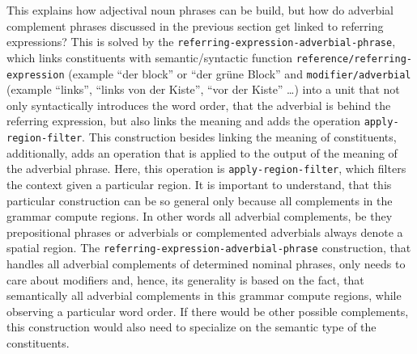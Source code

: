 This explains how adjectival noun phrases can be build, 
but how do adverbial complement phrases discussed in the 
previous section get linked to referring expressions? 
This is solved by the {\footnotesize\tt referring-expression-adverbial-phrase}, 
which links constituents with semantic/syntactic function 
{\footnotesize\tt reference/referring-expression} (example ``der block'' or ``der gr\"une Block'' 
and {\footnotesize\tt modifier/adverbial} (example ``links'', ``links von der Kiste'', 
``vor der Kiste'' \ldots) into a unit that not only syntactically introduces 
the word order, that the adverbial is behind the referring expression, 
but also links the meaning and adds the operation {\footnotesize\tt apply-region-filter}. 
This construction besides linking the meaning of constituents, additionally, 
adds an operation that is applied to the output of the meaning 
of the adverbial phrase. Here, this operation is {\footnotesize\tt apply-region-filter}, which 
filters the context given a particular region. It is important to understand, 
that this particular construction can be so general only because 
all complements in the grammar compute regions. In other words all adverbial complements, be they prepositional phrases or adverbials or complemented adverbials always denote a spatial region. 
The {\footnotesize\tt referring-expression-adverbial-phrase} construction, that handles 
all adverbial complements of determined nominal phrases, only needs to care about 
modifiers and, hence, its generality is based on the fact, that semantically 
all adverbial complements in this grammar compute regions, while observing 
a particular word order. If there would be other possible complements, this 
construction would also need to specialize on the semantic type of the constituents.



